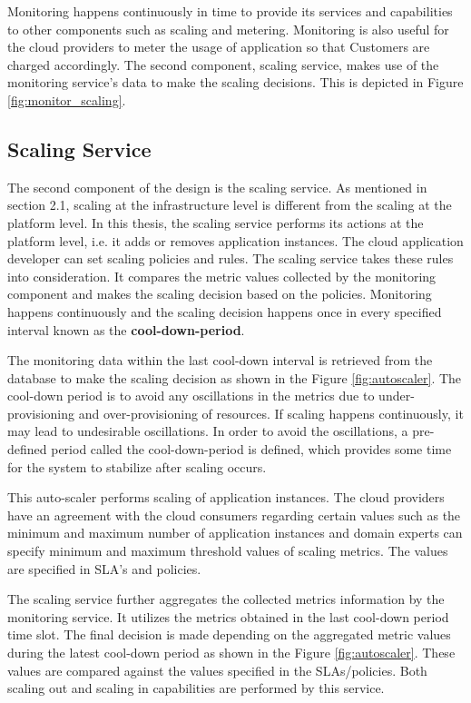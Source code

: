 \documentclass[article,type=msc,colorback,12pt,accentcolor=tud8b,table]{tudthesis}
\begin{document}
 	 	 Monitoring happens continuously in time to provide its services and capabilities to other components such as scaling and metering. Monitoring is also useful for the cloud providers to meter the usage of application so that Customers are charged accordingly. The second component, scaling service, makes use of the monitoring service's data to make the scaling decisions. This is depicted in Figure \ref{fig:monitor_scaling}.
 	
 	\subsection{Scaling Service}
 	
		The second component of the design is the scaling service. As mentioned in section 2.1, scaling at the infrastructure level is different from the scaling at the platform level. In this thesis, the scaling service performs its actions at the platform level, i.e. it adds or removes application instances. The cloud application developer can set scaling policies and rules. The scaling service takes these rules into consideration. It compares the metric values collected by the monitoring component and makes the scaling decision based on the policies. Monitoring happens continuously and the scaling decision happens once in every specified interval known as the \textbf{cool-down-period}. 
		
	\par The monitoring data within the last cool-down interval is retrieved from the database to make the scaling decision as shown in the Figure \ref{fig:autoscaler}. The cool-down period is to avoid any oscillations in the metrics due to under-provisioning and over-provisioning of resources. If scaling happens continuously, it may lead to undesirable oscillations. In order to avoid the oscillations, a pre-defined period called the cool-down-period is defined, which provides some time for the system to stabilize after scaling occurs. 	
		
 	This auto-scaler performs scaling of application instances. The cloud providers have an agreement with the cloud consumers regarding certain values such as the minimum and maximum number of application instances and domain experts can specify minimum and maximum threshold values of scaling metrics. The values are specified in SLA's and policies.
 
 	The scaling service further aggregates the collected metrics information by the monitoring service. It utilizes the metrics obtained in the last cool-down period time slot. The final decision is made depending on the aggregated metric values during the latest cool-down period as shown in the Figure \ref{fig:autoscaler}. These values are compared against the values specified in the SLAs/policies. Both scaling out and scaling in capabilities are performed by this service.
 	 	    
\end{document}

